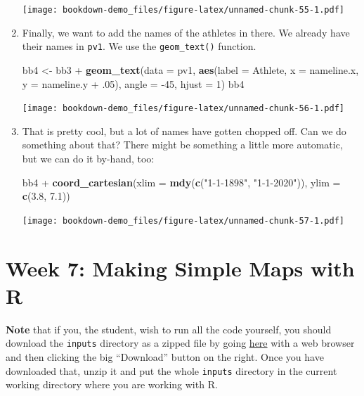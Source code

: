 \documentclass[]{book}
\newenvironment{Shaded}{\begin{snugshade}}{\end{snugshade}}
\newcommand{\KeywordTok}[1]{\textcolor[rgb]{0.13,0.29,0.53}{\textbf{{#1}}}}
\newcommand{\DataTypeTok}[1]{\textcolor[rgb]{0.13,0.29,0.53}{{#1}}}
\newcommand{\DecValTok}[1]{\textcolor[rgb]{0.00,0.00,0.81}{{#1}}}
\newcommand{\FloatTok}[1]{\textcolor[rgb]{0.00,0.00,0.81}{{#1}}}
\newcommand{\StringTok}[1]{\textcolor[rgb]{0.31,0.60,0.02}{{#1}}}
\newcommand{\NormalTok}[1]{{#1}}
\theoremstyle{definition}
\theoremstyle{definition}
\theoremstyle{remark}
\begin{document}
\begin{enumerate}
  \texttt{[image: bookdown-demo\_files/figure-latex/unnamed-chunk-55-1.pdf]}
\item
  Finally, we want to add the names of the athletes in there. We already
  have their names in \texttt{pv1}. We use the \texttt{geom\_text()}
  function.

\begin{Shaded}
\begin{Highlighting}[]
\NormalTok{bb4 <-}\StringTok{ }\NormalTok{bb3 +}\StringTok{ }\KeywordTok{geom_text}\NormalTok{(}\DataTypeTok{data =} \NormalTok{pv1, }
                       \KeywordTok{aes}\NormalTok{(}\DataTypeTok{label =} \NormalTok{Athlete, }
                           \DataTypeTok{x =} \NormalTok{nameline.x, }
                           \DataTypeTok{y =} \NormalTok{nameline.y +}\StringTok{ }\NormalTok{.}\DecValTok{05}\NormalTok{), }
                       \DataTypeTok{angle =} \NormalTok{-}\DecValTok{45}\NormalTok{, }\DataTypeTok{hjust =} \DecValTok{1}\NormalTok{)}
\NormalTok{bb4}
\end{Highlighting}
\end{Shaded}

  \texttt{[image: bookdown-demo\_files/figure-latex/unnamed-chunk-56-1.pdf]}
\item
  That is pretty cool, but a lot of names have gotten chopped off. Can
  we do something about that? There might be something a little more
  automatic, but we can do it by-hand, too:

\begin{Shaded}
\begin{Highlighting}[]
\NormalTok{bb4 +}\StringTok{ }\KeywordTok{coord_cartesian}\NormalTok{(}\DataTypeTok{xlim =} \KeywordTok{mdy}\NormalTok{(}\KeywordTok{c}\NormalTok{(}\StringTok{"1-1-1898"}\NormalTok{, }\StringTok{"1-1-2020"}\NormalTok{)), }\DataTypeTok{ylim =} \KeywordTok{c}\NormalTok{(}\FloatTok{3.8}\NormalTok{, }\FloatTok{7.1}\NormalTok{))}
\end{Highlighting}
\end{Shaded}

  \texttt{[image: bookdown-demo\_files/figure-latex/unnamed-chunk-57-1.pdf]}
\end{enumerate}

\chapter{Week 7: Making Simple Maps with R}\label{map-making-in-R}

\textbf{Note} that if you, the student, wish to run all the code
yourself, you should download the \texttt{inputs} directory as a zipped
file by going
\href{https://github.com/eriqande/rep-res-eeb-2017/blob/master/inputs.zip}{here}
with a web browser and then clicking the big ``Download'' button on the
right. Once you have downloaded that, unzip it and put the whole
\texttt{inputs} directory in the current working directory where you are
working with R.
\end{document}
